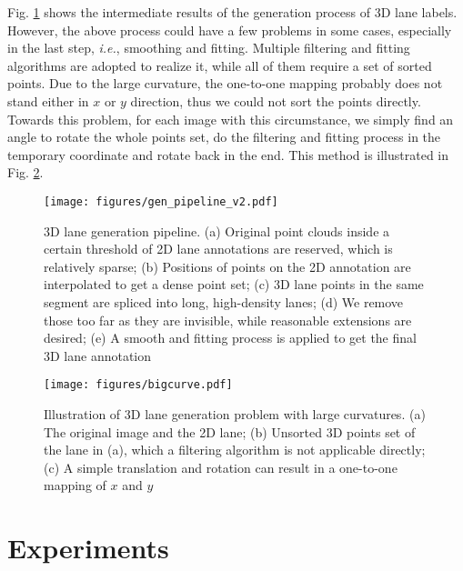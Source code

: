\documentclass[runningheads]{llncs}
\begin{document}
Fig. \ref{fig:sup-dataset gen pipeline} shows the intermediate results of the generation process of 3D lane labels.
However, the above process could have a few problems in some cases, especially in the last step, \textit{i.e.}, smoothing and fitting.
Multiple filtering and fitting algorithms are adopted to realize it, while all of them require a set of sorted points.
Due to the large curvature, the one-to-one mapping probably does not stand either in $x$ or $y$ direction, thus we could not sort the points directly. Towards this problem, for each image with this circumstance, we simply find an angle to rotate the whole points set, do the filtering and fitting process in the temporary coordinate and rotate back in the end. This method is illustrated in Fig. \ref{fig:sup-dataset large curvature}.

\begin{figure}[tb!]
    \centering
    \texttt{[image: figures/gen\_pipeline\_v2.pdf]}
    \caption{3D lane generation pipeline. (a) Original point clouds inside a certain threshold of 2D lane annotations are reserved, which is relatively sparse; (b) Positions of points on the 2D annotation are interpolated to get a dense point set; (c) 3D lane points in the same segment are spliced into long, high-density lanes; (d) We remove those too far as they are invisible, while reasonable extensions are desired; (e) A smooth and fitting process is applied to get the final 3D lane annotation}
    \label{fig:sup-dataset gen pipeline}
\end{figure}
\begin{figure}[tb!]
    \centering
    \texttt{[image: figures/bigcurve.pdf]}
    \caption{Illustration of 3D lane generation problem with large curvatures. (a) The original image and the 2D lane; (b) Unsorted 3D points set of the lane in (a), which a filtering algorithm is not applicable directly; (c) A simple translation and rotation can result in a one-to-one mapping of $x$ and $y$}
    \label{fig:sup-dataset large curvature}
\end{figure}








\section{Experiments}\label{sec: sup - exp}
\end{document}
